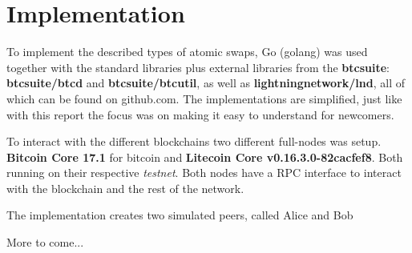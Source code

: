 \chapter{Implementation}
To implement the described types of atomic swaps, Go (golang) was used together with the standard libraries plus external libraries from the \textbf{btcsuite}: \textbf{btcsuite/btcd} and \textbf{btcsuite/btcutil}, as well as \textbf{lightningnetwork/lnd}, all of which can be found on github.com. The implementations are simplified, just like with this report the focus was on making it easy to understand for newcomers. 

To interact with the different blockchains two different full-nodes was setup. \textbf{Bitcoin Core 17.1} for bitcoin and \textbf{Litecoin Core  v0.16.3.0-82cacfef8}. Both running on their respective \textit{testnet}. Both nodes have a RPC interface to interact with the blockchain and the rest of the network. 

The implementation creates two simulated peers, called Alice and Bob 

\vspace{20mm}
More to come...